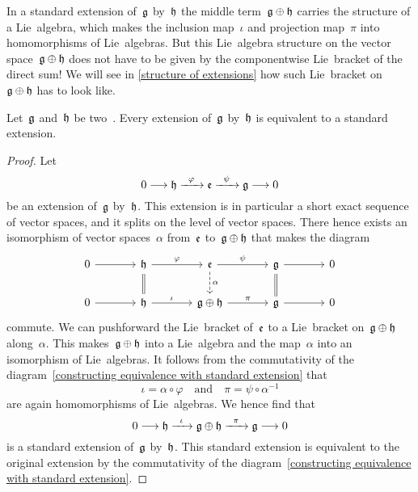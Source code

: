 \begin{warning}
	In a standard extension of~$\mathfrak{g}$ by~$\mathfrak{h}$ the middle term~$\mathfrak{g} \oplus \mathfrak{h}$ carries the structure of a Lie~algebra, which makes the inclusion map~$\iota$ and projection map~$\pi$ into homomorphisms of Lie~algebras.
	But this Lie~algebra structure on the vector space~$\mathfrak{g} \oplus \mathfrak{h}$ does not have to be given by the componentwise Lie~bracket of the direct sum!
	We will see in \cref{structure of extensions} how such Lie~bracket on~$\mathfrak{g} \oplus \mathfrak{h}$ has to look like.
\end{warning}


\begin{proposition}
	\label{every extension is equivalent to a standard one}
	Let~$\mathfrak{g}$ and~$\mathfrak{h}$ be two~\liealgebras{$\kf$}.
	Every extension of~$\mathfrak{g}$ by~$\mathfrak{h}$ is equivalent to a standard extension.
\end{proposition}


\begin{proof}
	Let
	\[
		0
		\to
		\hlie
		\xto{\varphi}
		\elie
		\xto{\psi}
		\glie
		\to
		0
	\]
	be an extension of~$\mathfrak{g}$ by~$\mathfrak{h}$.
	This extension is in particular a short exact sequence of vector spaces, and it splits on the level of vector spaces.
	There hence exists an isomorphism of vector spaces~$\alpha$ from~$\mathfrak{e}$ to~$\mathfrak{g} \oplus \mathfrak{h}$ that makes the diagram
	\begin{equation}
		\label{constructing equivalence with standard extension}
		\begin{tikzcd}[column sep = large]
			0
			\arrow{r}
			&
			\hlie
			\arrow{r}[above]{\varphi}
			\arrow[equal]{d}
			&
			\elie
			\arrow{r}[above]{\psi}
			\arrow[dashed]{d}[right]{\alpha}
			&
			\glie
			\arrow{r}
			\arrow[equal]{d}
			&
			0
			\\
			0
			\arrow{r}
			&
			\hlie
			\arrow{r}[above]{\iota}
			&
			\glie \oplus \hlie
			\arrow{r}[above]{\pi}
			&
			\glie
			\arrow{r}
			&
			0
		\end{tikzcd}
	\end{equation}
	commute.
	We can pushforward the Lie~bracket of~$\mathfrak{e}$ to a Lie~bracket on~$\mathfrak{g} \oplus \mathfrak{h}$ along~$\alpha$.
	This makes~$\mathfrak{g} \oplus \mathfrak{h}$ into a Lie~algebra and the map~$\alpha$ into an isomorphism of Lie~algebras.
	It follows from the commutativity of the diagram~\eqref{constructing equivalence with standard extension} that
	\[
		\iota = \alpha \circ \varphi
		\quad\text{and}\quad
		\pi = \psi \circ \alpha^{-1}
	\]
	are again homomorphisms of Lie~algebras.
	We hence find that
	\[
		0
		\to
		\hlie
		\xto{\iota}
		\glie \oplus \hlie
		\xto{\pi}
		\glie
		\to
		0
	\]
	is a standard extension of~$\mathfrak{g}$ by~$\mathfrak{h}$.
	This standard extension is equivalent to the original extension by the commutativity of the diagram~\eqref{constructing equivalence with standard extension}.
\end{proof}


